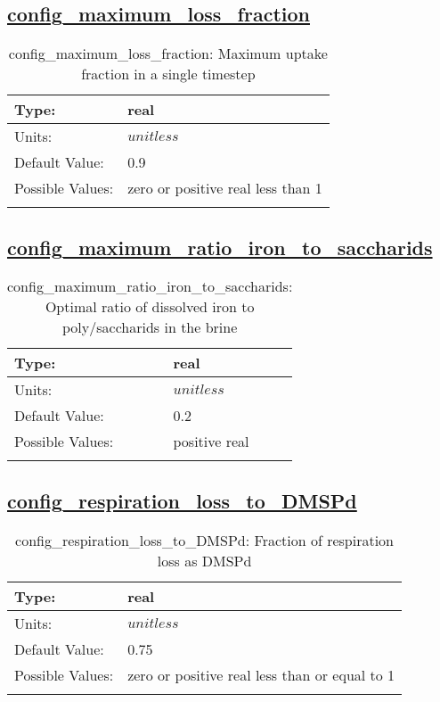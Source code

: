 \subsection[config\_maximum\_loss\_fraction]{\hyperref[sec:nm_tab_biogeochemistry]{config\_maximum\_loss\_fraction}}
\label{subsec:nm_sec_config_maximum_loss_fraction}
\begin{center}
\begin{longtable}{| p{2.0in} || p{4.0in} |}
    \hline
    Type: & real \\
    \hline
    Units: & $unitless$ \\
    \hline
    Default Value: & 0.9 \\
    \hline
    Possible Values: & zero or positive real less than 1 \\
    \hline
    \caption{config\_maximum\_loss\_fraction: Maximum uptake fraction in a single timestep}
\end{longtable}
\end{center}
\subsection[config\_maximum\_ratio\_iron\_to\_saccharids]{\hyperref[sec:nm_tab_biogeochemistry]{config\_maximum\_ratio\_iron\_to\_saccharids}}
\label{subsec:nm_sec_config_maximum_ratio_iron_to_saccharids}
\begin{center}
\begin{longtable}{| p{2.0in} || p{4.0in} |}
    \hline
    Type: & real \\
    \hline
    Units: & $unitless$ \\
    \hline
    Default Value: & 0.2 \\
    \hline
    Possible Values: & positive real \\
    \hline
    \caption{config\_maximum\_ratio\_iron\_to\_saccharids: Optimal ratio of dissolved iron to poly/saccharids in the brine}
\end{longtable}
\end{center}
\subsection[config\_respiration\_loss\_to\_DMSPd]{\hyperref[sec:nm_tab_biogeochemistry]{config\_respiration\_loss\_to\_DMSPd}}
\label{subsec:nm_sec_config_respiration_loss_to_DMSPd}
\begin{center}
\begin{longtable}{| p{2.0in} || p{4.0in} |}
    \hline
    Type: & real \\
    \hline
    Units: & $unitless$ \\
    \hline
    Default Value: & 0.75 \\
    \hline
    Possible Values: & zero or positive real less than or equal to 1 \\
    \hline
    \caption{config\_respiration\_loss\_to\_DMSPd: Fraction of respiration loss as DMSPd}
\end{longtable}
\end{center}
